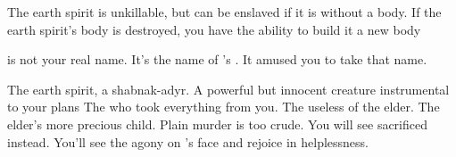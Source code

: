 \documentclass[char]{Pestilence}
\begin{document}
\begin{itemz}[Notes]
	\item The earth spirit is unkillable, but can be enslaved if it is without a body. If the earth spirit's body is destroyed, you have the ability to build it a new body
	\item \cShaman{} is not your real name. It's the name of \cElder{\intro}'s \cElderSpouse{\spouse}. It amused you to take that name. 
\end{itemz}

\begin{contacts}
	\contact{\cPlaguebearer{}} The earth spirit, a shabnak-adyr. A powerful but innocent creature instrumental to your plans
	\contact{\cElder{}} The \cElder{\human} who took everything from you. 
	\contact{\cApprentice{}} The useless \cApprentice{\offspring} of the elder.
	\contact{\cRebel{}} The elder's more precious child. Plain murder is too crude. You will see \cRebel{\them} sacrificed instead. You'll see the agony on \cElder{}'s face and rejoice in \cElder{\their} helplessness.
\end{contacts}
\end{document}
